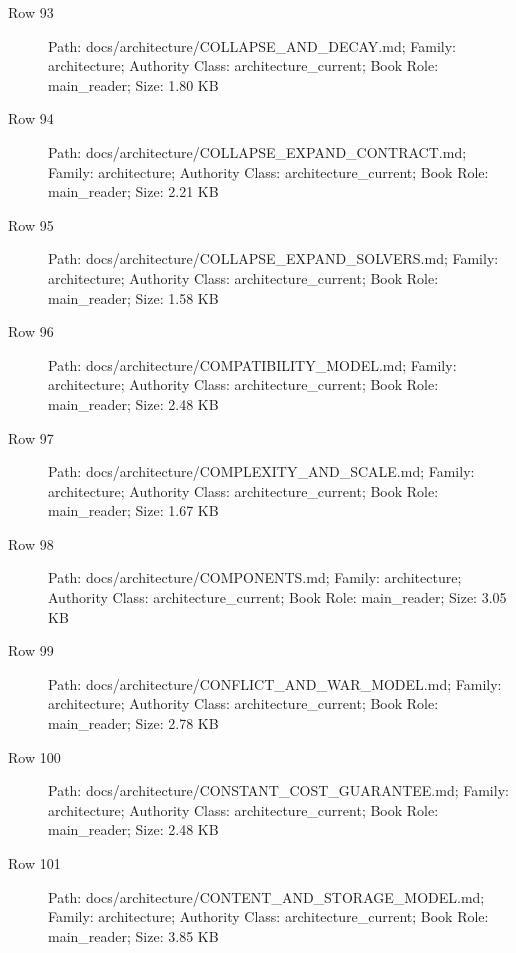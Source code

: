 \documentclass[9pt,a4paper]{book}
\begin{document}
\begin{description}
\item[Row 93] Path: docs/\allowbreak{}architecture/\allowbreak{}COLLAPSE\_\allowbreak{}AND\_\allowbreak{}DECAY.\allowbreak{}md; Family: architecture; Authority Class: architecture\_\allowbreak{}current; Book Role: main\_\allowbreak{}reader; Size: 1.\allowbreak{}80 KB
\item[Row 94] Path: docs/\allowbreak{}architecture/\allowbreak{}COLLAPSE\_\allowbreak{}EXPAND\_\allowbreak{}CONTRACT.\allowbreak{}md; Family: architecture; Authority Class: architecture\_\allowbreak{}current; Book Role: main\_\allowbreak{}reader; Size: 2.\allowbreak{}21 KB
\item[Row 95] Path: docs/\allowbreak{}architecture/\allowbreak{}COLLAPSE\_\allowbreak{}EXPAND\_\allowbreak{}SOLVERS.\allowbreak{}md; Family: architecture; Authority Class: architecture\_\allowbreak{}current; Book Role: main\_\allowbreak{}reader; Size: 1.\allowbreak{}58 KB
\item[Row 96] Path: docs/\allowbreak{}architecture/\allowbreak{}COMPATIBILITY\_\allowbreak{}MODEL.\allowbreak{}md; Family: architecture; Authority Class: architecture\_\allowbreak{}current; Book Role: main\_\allowbreak{}reader; Size: 2.\allowbreak{}48 KB
\item[Row 97] Path: docs/\allowbreak{}architecture/\allowbreak{}COMPLEXITY\_\allowbreak{}AND\_\allowbreak{}SCALE.\allowbreak{}md; Family: architecture; Authority Class: architecture\_\allowbreak{}current; Book Role: main\_\allowbreak{}reader; Size: 1.\allowbreak{}67 KB
\item[Row 98] Path: docs/\allowbreak{}architecture/\allowbreak{}COMPONENTS.\allowbreak{}md; Family: architecture; Authority Class: architecture\_\allowbreak{}current; Book Role: main\_\allowbreak{}reader; Size: 3.\allowbreak{}05 KB
\item[Row 99] Path: docs/\allowbreak{}architecture/\allowbreak{}CONFLICT\_\allowbreak{}AND\_\allowbreak{}WAR\_\allowbreak{}MODEL.\allowbreak{}md; Family: architecture; Authority Class: architecture\_\allowbreak{}current; Book Role: main\_\allowbreak{}reader; Size: 2.\allowbreak{}78 KB
\item[Row 100] Path: docs/\allowbreak{}architecture/\allowbreak{}CONSTANT\_\allowbreak{}COST\_\allowbreak{}GUARANTEE.\allowbreak{}md; Family: architecture; Authority Class: architecture\_\allowbreak{}current; Book Role: main\_\allowbreak{}reader; Size: 2.\allowbreak{}48 KB
\item[Row 101] Path: docs/\allowbreak{}architecture/\allowbreak{}CONTENT\_\allowbreak{}AND\_\allowbreak{}STORAGE\_\allowbreak{}MODEL.\allowbreak{}md; Family: architecture; Authority Class: architecture\_\allowbreak{}current; Book Role: main\_\allowbreak{}reader; Size: 3.\allowbreak{}85 KB

\end{description}
\end{document}
